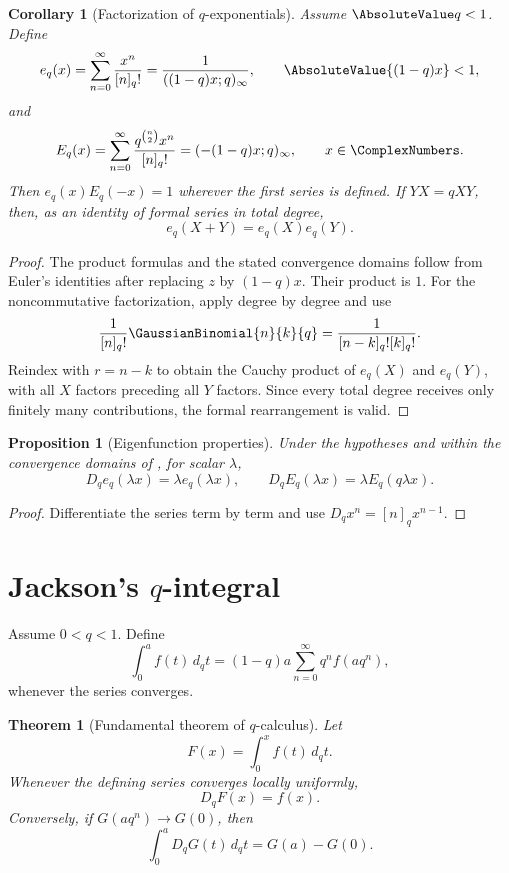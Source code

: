 \documentclass[11pt,a4paper,oneside,openany]{book}
\newtheorem{theorem}{Theorem}[chapter]
\newtheorem{proposition}[proposition]{Proposition}
\newtheorem{corollary}[corollary]{Corollary}
\theoremstyle{definition}
\theoremstyle{remark}
\begin{document}
\begin{corollary}[Factorization of $q$-exponentials]\label{cor:qexp-factor}
Assume $\AbsoluteValue q<1$.  Define
\[
 e_q(x)=\sum_{n=0}^{\infty}\frac{x^n}{[n]_q!}
 =\frac1{((1-q)x;q)_\infty},
 \qquad \AbsoluteValue{(1-q)x}<1,
\]
and
\[
 E_q(x)=\sum_{n=0}^{\infty}\frac{q^{\binom n2}x^n}{[n]_q!}
 =(-(1-q)x;q)_\infty,
 \qquad x\in\ComplexNumbers.
\]
Then $e_q(x)E_q(-x)=1$ wherever the first series is defined.  If $YX=qXY$, then, as an identity of formal series in total degree,
\[
 e_q(X+Y)=e_q(X)e_q(Y).
\]
\end{corollary}

\begin{proof}
The product formulas and the stated convergence domains follow from Euler's identities after replacing $z$ by $(1-q)x$.  Their product is $1$.  For the noncommutative factorization, apply  degree by degree and use
\[
 \frac1{[n]_q!}\GaussianBinomial{n}{k}{q}
 =\frac1{[n-k]_q![k]_q!}.
\]
Reindex with $r=n-k$ to obtain the Cauchy product of $e_q(X)$ and $e_q(Y)$, with all $X$ factors preceding all $Y$ factors.  Since every total degree receives only finitely many contributions, the formal rearrangement is valid.
\end{proof}

\begin{proposition}[Eigenfunction properties]\label{prop:qexp-eigen}
Under the hypotheses and within the convergence domains of , for scalar $\lambda$,
\[
 D_qe_q(\lambda x)=\lambda e_q(\lambda x),
 \qquad
 D_qE_q(\lambda x)=\lambda E_q(q\lambda x).
\]
\end{proposition}

\begin{proof}
Differentiate the series term by term and use $D_qx^n=[n]_qx^{n-1}$.
\end{proof}

\section{Jackson's \texorpdfstring{$q$}{q}-integral}

Assume $0<q<1$.  Define
\[
 \int_0^a f(t)\,d_qt
 =(1-q)a\sum_{n=0}^{\infty}q^nf(aq^n),
\]
whenever the series converges.

\begin{theorem}[Fundamental theorem of $q$-calculus]\label{thm:q-fundamental}
Let
\[
 F(x)=\int_0^x f(t)\,d_qt.
\]
Whenever the defining series converges locally uniformly,
\[
 D_qF(x)=f(x).
\]
Conversely, if $G(aq^n)\to G(0)$, then
\[
 \int_0^aD_qG(t)\,d_qt=G(a)-G(0).
\]
\end{theorem}
\end{document}
